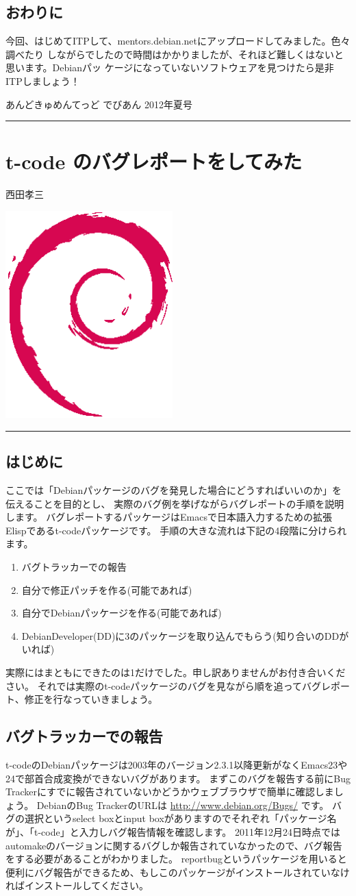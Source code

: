 \documentclass[mingoth,a4paper]{jsarticle}
\renewcommand{\dancersection}[2]{%
\newpage
あんどきゅめんてっど でびあん 2012年夏号
%
\vspace{0.1mm}\\
{\color{dancerdarkblue}\rule{\hsize}{2mm}}

%
%
\begin{minipage}[t]{0.6\hsize}
\color{dancerdarkblue}
\vspace{1cm}
\section{#1}
\hfill{}#2\\
\end{minipage}
\begin{minipage}[t]{0.4\hsize}
\vspace{-2cm}
\hfill{}\includegraphics[height=8cm]{image200502/openlogo-nd.eps}\\
\vspace{-5cm}
\end{minipage}
%
{\color{dancerlightblue}\rule{0.66\hsize}{2mm}}
%
\vspace{2cm}
}
\begin{document}
\subsection{おわりに}
今回、はじめてITPして、mentors.debian.netにアップロードしてみました。色々調べたり
しながらでしたので時間はかかりましたが、それほど難しくはないと思います。Debianパッ
ケージになっていないソフトウェアを見つけたら是非ITPしましょう！

\dancersection{t-code のバグレポートをしてみた}{西田孝三}

\subsection{はじめに}

ここでは「Debianパッケージのバグを発見した場合にどうすればいいのか」を伝えることを目的とし、
実際のバグ例を挙げながらバグレポートの手順を説明します。
バグレポートするパッケージはEmacsで日本語入力するための拡張Elispであるt-codeパッケージです。
手順の大きな流れは下記の4段階に分けられます。

\begin{enumerate}
  \item バグトラッカーでの報告
  \item 自分で修正パッチを作る(可能であれば)
  \item 自分でDebianパッケージを作る(可能であれば)
  \item DebianDeveloper(DD)に3のパッケージを取り込んでもらう(知り合いのDDがいれば)
\end{enumerate}

実際にはまともにできたのは1だけでした。申し訳ありませんがお付き合いください。
それでは実際のt-codeパッケージのバグを見ながら順を追ってバグレポート、修正を行なっていきましょう。

\subsection{バグトラッカーでの報告}

t-codeのDebianパッケージは2003年のバージョン2.3.1以降更新がなくEmacs23や24で部首合成変換ができないバグがあります。
まずこのバグを報告する前にBug Trackerにすでに報告されていないかどうかウェブブラウザで簡単に確認しましょう。
DebianのBug TrackerのURLは \url{http://www.debian.org/Bugs/} です。
バグの選択というselect boxとinput boxがありますのでそれぞれ「パッケージ名が」、「t-code」と入力しバグ報告情報を確認します。
2011年12月24日時点ではautomakeのバージョンに関するバグしか報告されていなかったので、バグ報告をする必要があることがわかりました。
reportbugというパッケージを用いると便利にバグ報告ができるため、もしこのパッケージがインストールされていなければインストールしてください。
\end{document}
